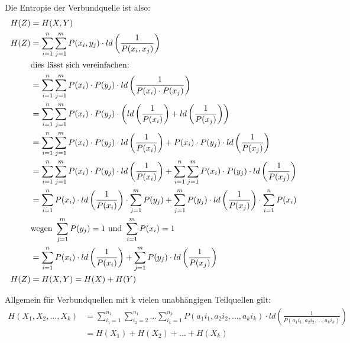 Die Entropie der Verbundquelle ist also:
\begin{align*}
	H(Z) &= H(X,Y) \\
	H(Z) &= \sum_{i = 1}^n \sum_{j = 1}^m P(x_i,y_j) 
	     	\cdot ld \left( \frac{1}{P(x_i,x_j)} \right) \\
	     & \textnormal{dies lässt sich vereinfachen:} \\
	     &= \sum_{i = 1}^n \sum_{j = 1}^m P(x_i) \cdot P(y_j) 
	     	\cdot ld \left( \frac{1}{P(x_i)\cdot P(x_j)} \right) \\
	     &= \sum_{i = 1}^n \sum_{j = 1}^m P(x_i) \cdot P(y_j) 
	     	\cdot \left( ld \left( \frac{1}{P(x_i)} \right) 
	     	+ ld \left( \frac{1}{P(x_j)} \right) \right) \\
	     &= \sum_{i = 1}^n \sum_{j = 1}^m P(x_i) \cdot P(y_j) 
	     	\cdot ld \left( \frac{1}{P(x_i)} \right) 
	     	+ P(x_i) \cdot P(y_j) 
	     	\cdot ld \left( \frac{1}{P(x_j)} \right) \\
	     &= \sum_{i = 1}^n \sum_{j = 1}^m P(x_i) \cdot P(y_j) 
	     	\cdot ld \left( \frac{1}{P(x_i)} \right) 
	     	+ \sum_{i = 1}^n \sum_{j = 1}^m P(x_i) \cdot P(y_j) 
	     	\cdot ld \left( \frac{1}{P(x_j)} \right) \\
	     &= \sum_{i = 1}^n P(x_i) \cdot ld \left( \frac{1}{P(x_i)} \right) 
	     	\cdot \sum_{j = 1}^m P(y_j)
	     	+ \sum_{j = 1}^m P(y_j) \cdot ld \left( \frac{1}{P(x_j)} \right)
	     	\cdot \sum_{i = 1}^n P(x_i) \\
	     & \textnormal{wegen } \sum_{j = 1}^m P(y_j) = 1 \textnormal{ und } 
	     	\sum_{i = 1}^m P(x_i) = 1 \\
	     &= \sum_{i = 1}^n P(x_i) \cdot ld \left( \frac{1}{P(x_i)} \right)
	     	+ \sum_{j = 1}^m P(y_j) \cdot ld \left( \frac{1}{P(x_j)} \right) \\
	H(Z) &= H(X,Y) = H(X) + H(Y) \\     
\end{align*}

Allgemein für Verbundquellen mit k vielen unabhängigen Teilquellen gilt:
\begin{align*}
	H(X_1, X_2, \ldots, X_k) &= 
		\sum_{i_1 = 1}^{n_1} \sum_{i_2 = 2}^{n_1} \ldots \sum_{i_k = 1}^{n_k}
		P(a_1i_1, a_2i_2, \ldots, a_ki_k) 
		\cdot ld \left( \frac{1}{P(a_1i_1, a_2i_2, \ldots, a_ki_k)} \right) \\
		&= H(X_1) + H(X_2) + \ldots + H(X_k)
\end{align*}
 

